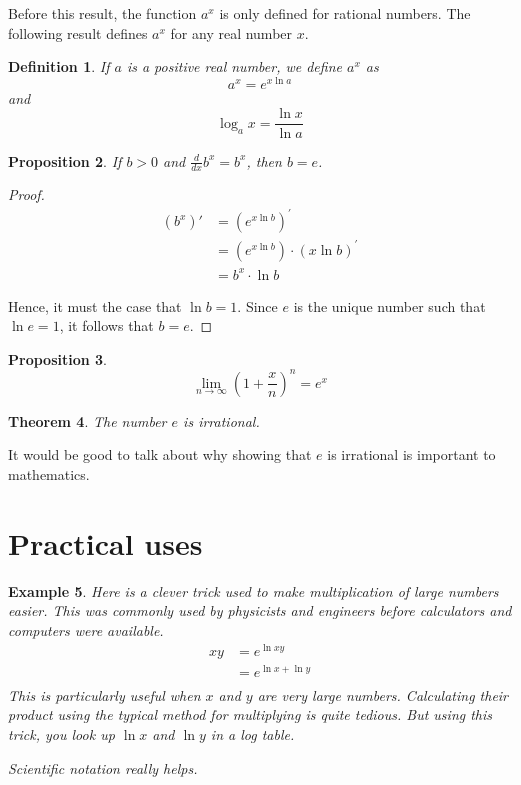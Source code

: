 \documentclass[12pt]{article}
\theoremstyle{mystyle}
\newtheorem{thm}{Theorem}
\newtheorem{defn}[thm]{Definition}
\newtheorem{prop}[thm]{Proposition}
\newtheorem{example}[thm]{Example}
\begin{document}
Before this result, the function $a^x$ is only defined for rational numbers. The
following result defines $a^x$ for any real number $x$.
\begin{defn}
  If $a$ is a positive real number, we define $a^x$ as
  $$ a^x = e^{x \ln a} $$
  and
  $$ \log_a x = \frac{\ln x}{\ln a} $$
\end{defn}


\begin{prop}
  If $b > 0$ and $\frac{d}{dx} b^x = b^x$, then $b = e$.
\end{prop}
\begin{proof}
  \begin{align*}
    (b^x)' &= (e^{x \ln b})^\prime \\
           &= (e^{x \ln b}) \cdot (x \ln b)^\prime  \\
           &= b^x \cdot \ln b
  \end{align*}
  
  Hence, it must the case that $\ln b = 1$. Since $e$ is the unique number such
  that $\ln e = 1$, it follows that $b=e$.
\end{proof}


\begin{prop}
  $$ \lim_{n \to \infty} \left( 1 + \frac{x}{n} \right)^n = e^x $$
\end{prop}


\begin{thm}
  The number $e$ is irrational. 
\end{thm}

It would be good to talk about why showing that $e$ is irrational is important
to mathematics.

\section{Practical uses}
\begin{example}
  Here is a clever trick used to make multiplication of large numbers easier.
  This was commonly used by physicists and engineers before calculators and
  computers were available. 
  \begin{align*}
    xy &= e^{\ln xy} \\
       &= e^{\ln x + \ln y} \\
  \end{align*}
  This is particularly useful when $x$ and $y$ are very large numbers.
  Calculating their product using the typical method for multiplying is quite
  tedious. But using this trick, you look up $\ln x$ and $\ln y$ in a log table.

  Scientific notation really helps.
\end{example}
\end{document}
